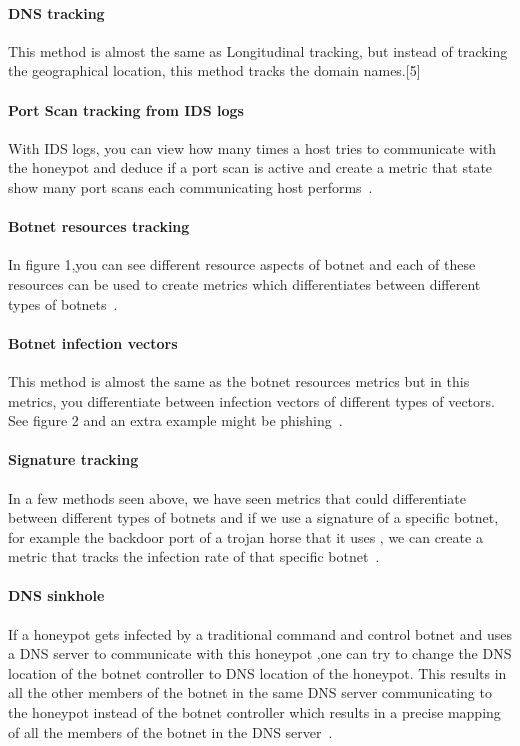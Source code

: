 \paragraph{DNS tracking}
This method is almost the same as Longitudinal tracking, but instead of tracking the geographical location, this method tracks the domain names.[5]

\paragraph{Port Scan tracking from IDS logs}
With IDS logs, you can view how many times a host tries to communicate with the honeypot and deduce if a port scan is active and create a metric that state show many port scans each communicating host performs~\cite{WP2010}.

\paragraph{Botnet resources tracking}
In figure 1,you can see different resource aspects of botnet and each of these resources can be used to create metrics which differentiates between different types of botnets~\cite{GJ2007}.


\paragraph{Botnet infection vectors}
This method is almost the same as the botnet resources metrics but in this metrics, you differentiate between  infection vectors of different types of vectors. See figure 2 and an extra example might be phishing~\cite{GJ2007}.


\paragraph{Signature tracking}
In a few methods seen above, we have seen metrics that could differentiate between different types of botnets and if we use a signature of a specific botnet, for example the backdoor port of a trojan horse that it uses , we can create a metric that tracks the infection rate of that specific botnet~\cite{AM2005}.

\paragraph{DNS sinkhole}
If a honeypot gets infected by a traditional command and control botnet  and uses a DNS server to communicate with this honeypot ,one can try to change the DNS location of the botnet controller to DNS location of the honeypot. This results in all the other members of the botnet in the same DNS server communicating to the honeypot instead of the botnet controller which results in a precise mapping of all the members of the botnet in the DNS server~\cite{WP2010}.

